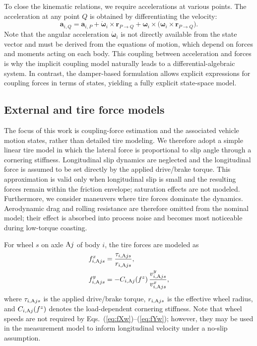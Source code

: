 \documentclass[conference]{IEEEtran}
\begin{document}
To close the kinematic relations, we require accelerations at various points. The acceleration at any point $Q$ is obtained by differentiating the velocity:
\begin{equation}
    \bm a_{i,Q} =
\bm a_{i,P}
+ \dot{\bm\omega}_i \times \bm r_{P\to Q}
+ \bm\omega_i \times \bigl(\bm\omega_i \times \bm r_{P\to Q}\bigr).
\end{equation}
Note that the angular acceleration $\dot{\bm\omega}_i$ is not directly available from the state vector and must be derived from the equations of motion, which depend on forces and moments acting on each body. This coupling between acceleration and forces is why the implicit coupling model naturally leads to a differential-algebraic system. In contrast, the damper-based formulation allows explicit expressions for coupling forces in terms of states, yielding a fully explicit state-space model.

\subsection{External and tire force models} \label{sec:tire_model}
The focus of this work is coupling-force estimation and the associated vehicle motion states, rather than detailed tire modeling. We therefore adopt a simple linear tire model in which the lateral force is proportional to slip angle through a cornering stiffness. Longitudinal slip dynamics are neglected and the longitudinal force is assumed to be set directly by the applied drive/brake torque. This approximation is valid only when longitudinal slip is small and the resulting forces remain within the friction envelope; saturation effects are not modeled. Furthermore, we consider maneuvers where tire forces dominate the dynamics. Aerodynamic drag and rolling resistance are therefore omitted from the nominal model; their effect is absorbed into process noise and becomes most noticeable during low-torque coasting.

For wheel $s$ on axle $\text{A} j$ of body $i$, the tire forces are modeled as
\begin{align}
    f^{x}_{i,\text{A} j s} &= \frac{\tau_{i,\text{A} j s}}{r_{i,\text{A} j s}}, \label{eq:fXw}\\
    f^{y}_{i,\text{A} j s} &= -C_{i,\text{A} j}(f^z)\,\frac{v^y_{i,\text{A} j s}}{v^x_{i,\text{A} j s}}, \label{eq:fYw}
\end{align}
where $\tau_{i,\text{A} j s}$ is the applied drive/brake torque, $r_{i,\text{A} j s}$ is the effective wheel radius, and $C_{i,\text{A} j}(f^z)$ denotes the load-dependent cornering stiffness. Note that wheel speeds are not required by Eqs.~(\ref{eq:fXw})--(\ref{eq:fYw}); however, they may be used in the measurement model to inform longitudinal velocity under a no-slip assumption.
\end{document}
